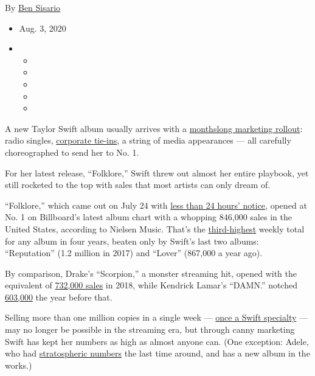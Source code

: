 By \href{https://www.nytimes3xbfgragh.onion/by/ben-sisario}{Ben Sisario}

\begin{itemize}
\item
  Aug. 3, 2020
\item
  \begin{itemize}
  \item
  \item
  \item
  \item
  \item
  \end{itemize}
\end{itemize}

A new Taylor Swift album usually arrives with a
\href{https://www.nytimes3xbfgragh.onion/2014/08/19/business/media/taylor-swift-maximizes-use-of-social-media-in-release-of-new-album.html}{monthslong
marketing rollout}: radio singles,
\href{https://artsbeat.blogs.nytimes3xbfgragh.onion/2012/10/30/swifts-red-tops-a-million-sales-in-week-1/}{corporate
tie-ins}, a string of media appearances --- all carefully choreographed
to send her to No. 1.

For her latest release, ``Folklore,'' Swift threw out almost her entire
playbook, yet still rocketed to the top with sales that most artists can
only dream of.

``Folklore,'' which came out on July 24 with
\href{https://www.nytimes3xbfgragh.onion/2020/07/23/arts/music/taylor-swift-kanye-west.html}{less
than 24 hours' notice}, opened at No. 1 on Billboard's latest album
chart with a whopping 846,000 sales in the United States, according to
Nielsen Music. That's the
\href{https://www.billboard.com/articles/business/chart-beat/9428290/taylor-swift-folklore-billboard-200-number-1}{third-highest}
weekly total for any album in four years, beaten only by Swift's last
two albums: ``Reputation'' (1.2 million in 2017) and ``Lover'' (867,000
a year ago).

By comparison, Drake's ``Scorpion,'' a monster streaming hit, opened
with the equivalent of
\href{https://www.billboard.com/articles/columns/chart-beat/8464342/drake-scorpion-debut-no1-billboard-200-chart-sets-streaming-record}{732,000
sales} in 2018, while Kendrick Lamar's ``DAMN.'' notched
\href{https://www.nytimes3xbfgragh.onion/2017/04/24/arts/music/kendrick-lamar-damn-billboard-debut.html}{603,000}
the year before that.

Selling more than one million copies in a single week ---
\href{https://www.nytimes3xbfgragh.onion/2019/09/02/arts/music/taylor-swift-lover-sales.html}{once
a Swift specialty} --- may no longer be possible in the streaming era,
but through canny marketing Swift has kept her numbers as high as almost
anyone can. (One exception: Adele, who had
\href{https://www.nytimes3xbfgragh.onion/2015/11/28/business/media/adele-shatters-music-industry-truisms-by-going-against-the-grain.html}{stratospheric
numbers} the last time around, and has a new album in the works.)


